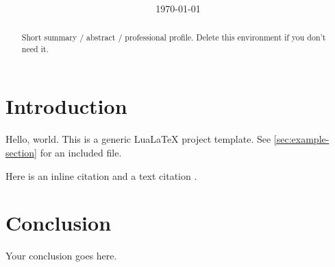 \documentclass[11pt,a4paper]{article}
\title{\DocumentTitle \\ \large \DocumentSubtitle}
\author{\AuthorName \\ \href{mailto:\AuthorEmail}{\AuthorEmail}}
\date{\today}
\begin{document}
\maketitle
\thispagestyle{empty} %

\begin{abstract}
Short summary / abstract / professional profile.
Delete this environment if you don't need it.
\end{abstract}

\section{Introduction}
\label{sec:intro}
Hello, world. This is a generic LuaLaTeX project template.
See \cref{sec:example-section} for an included file.

Here is an inline citation \parencite{examplekey} and a text citation \textcite{examplekey}.



\section{Conclusion}
Your conclusion goes here.

\printbibliography
\end{document}
